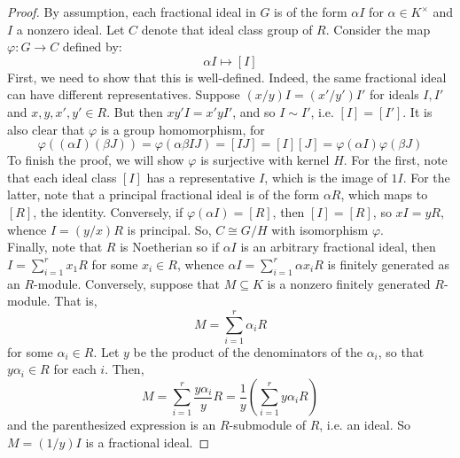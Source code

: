 \begin{proof}
	By assumption, each fractional ideal in $G$ is of the form $\alpha I$ for $\alpha \in K^\times$ and $I$ a nonzero ideal. Let $C$ denote that ideal class group of $R$. Consider the map $\varphi : G \to C$ defined by:
	\[ \alpha I \mapsto [I] \]
	First, we need to show that this is well-defined. Indeed, the same fractional ideal can have different representatives. Suppose $(x/y)I = (x'/y')I'$ for ideals $I,I'$ and $x,y,x',y' \in R$. But then $xy'I = x'yI'$, and so $I \sim I'$, i.e. $[I]=[I']$. It is also clear that $\varphi$ is a group homomorphism, for
	\[ \varphi((\alpha I)(\beta J)) = \varphi(\alpha\beta IJ) = [IJ] = [I][J] = \varphi(\alpha I)\varphi(\beta J) \]
	To finish the proof, we will show $\varphi$ is surjective with kernel $H$. For the first, note that each ideal class $[I]$ has a representative $I$, which is the image of $1I$. For the latter, note that a principal fractional ideal is of the form $\alpha R$, which maps to $[R]$, the identity. Conversely, if $\varphi(\alpha I) = [R]$, then $[I] = [R]$, so $xI = yR$, whence $I = (y/x)R$ is principal. So, $C \cong G/H$ with isomorphism $\varphi$. \\
	
	Finally, note that $R$ is Noetherian so if $\alpha I$ is an arbitrary fractional ideal, then $I = \sum_{i=1}^r x_1R$ for some $x_i \in R$, whence $\alpha I = \sum_{i=1}^r \alpha x_iR$ is finitely generated as an $R$-module. Conversely, suppose that $M \subseteq K$ is a nonzero finitely generated $R$-module. That is,
	\[ M = \sum_{i=1}^r \alpha_iR \]
	for some $\alpha_i \in R$. Let $y$ be the product of the denominators of the $\alpha_i$, so that $y\alpha_i \in R$ for each $i$. Then,
	\[ M = \sum_{i=1}^r \frac{y\alpha_i}{y}R = \frac{1}{y}\left(\sum_{i=1}^r y\alpha_iR\right) \]
	and the parenthesized expression is an $R$-submodule of $R$, i.e. an ideal. So $M = (1/y)I$ is a fractional ideal.
\end{proof}
